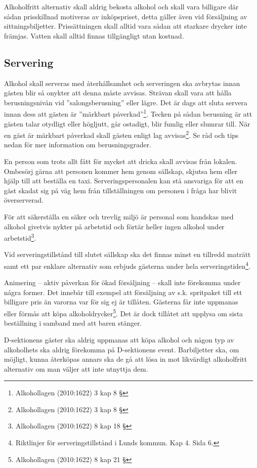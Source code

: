 \documentclass[]{dsekkallelse}
\begin{document}
Alkoholfritt alternativ skall aldrig bekosta alkohol och skall vara billigare där sådan prisskillnad motiveras av inköpspriset, detta gäller även vid försäljning av sittningsbiljetter. Prissättningen skall alltid vara sådan att starkare drycker inte främjas. Vatten skall alltid finnas tillgängligt utan kostnad.

\subsection{Servering}

Alkohol skall serveras med återhållsamhet och serveringen ska avbrytas innan gästen blir så
onykter att denna måste avvisas. Strävan skall vara att hålla berusningsnivån vid ''salongsberusning'' eller lägre. Det är dags att sluta servera innan dess att gästen är ''märkbart påverkad''\footnote{Alkohollagen (2010:1622) 3 kap 8 §
}. Tecken på sådan berusning är att gästen talar otydligt eller högljutt, går ostadigt, blir fumlig eller slumrar till. När en gäst är märkbart påverkad skall gästen enligt lag avvisas\footnote{Alkohollagen (2010:1622) 3 kap 8 §}. Se råd och tips nedan för mer information om berusningsgrader.

En person som trots allt fått för mycket att dricka skall avvisas från lokalen. Ombesörj gärna att personen kommer hem genom sällskap, skjutsa hem eller hjälp till att beställa en taxi. Serveringspersonalen kan stå ansvariga för att en gäst skadat sig på väg hem från tillställningen om personen i fråga har blivit överserverad.

För att säkerställa en säker och trevlig miljö är personal som handskas med alkohol givetvis nykter på arbetstid och förtär heller ingen alkohol under arbetstid\footnote{Alkohollagen (2010:1622) 8 kap 18 §}.

Vid serveringstillstånd till slutet sällskap ska det finnas minst en tillredd maträtt samt ett par
enklare alternativ som erbjuds gästerna under hela serveringstiden\footnote{Riktlinjer för serveringstillstånd i Lunds kommun. Kap 4. Sida 6.}.

Animering – aktiv påverkan för ökad försäljning – skall inte förekomma under några former. Det innebär till exempel att försäljning av s.k. spritpaket till ett billigare pris än varorna var för sig ej är tillåten. Gästerna får inte uppmanas eller förmås att köpa alkoholdrycker\footnote{Alkohollagen (2010:1622) 8 kap 21 §}. Det
är dock tillåtet att upplysa om sista beställning i samband med att baren stänger.

D-sektionens gäster ska aldrig uppmanas att köpa alkohol och någon typ av alkoholhets
ska aldrig förekomma på D-sektionens event. Barbiljetter ska, om möjligt, kunna
återköpas annars ska de gå att lösa in mot likvärdigt alkoholfritt alternativ om man väljer att
inte utnyttja dem.
\end{document}

